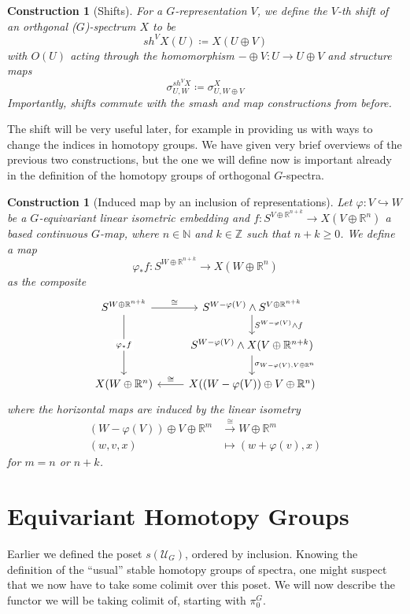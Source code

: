 \documentclass{scrartcl}
\newcommand{\bN}{\mathbb{N}}
\newcommand{\bZ}{\mathbb{Z}}
\newcommand{\bR}{\mathbb{R}}
\newtheorem{cons}[subsection]{Construction}
\begin{document}
\begin{cons}[Shifts]
    For a $G$-representation $V$, we define the \textit{$V$-th shift} of an orthgonal ($G$)-spectrum $X$ to be $$sh^VX(U)\coloneqq X(U\oplus V)$$ with $O(U)$ acting through the homomorphism $-\oplus V:U\to U\oplus V$ and structure maps $$\sigma^{sh^VX}_{U,W}\coloneqq \sigma^X_{U, W\oplus V}$$
    Importantly, shifts commute with the smash and map constructions from before.
\end{cons}

The shift will be very useful later, for example in providing us with ways to change the indices in homotopy groups. We have given very brief overviews of the previous two constructions, but the one we will define now is important already in the definition of the homotopy groups of orthogonal $G$-spectra.

\begin{cons}[Induced map by an inclusion of representations]
    Let $\varphi:V\hookrightarrow W$ be a $G$-equivariant linear isometric embedding and $f:S^{V\oplus\bR^{n+k}}\to X(V\oplus\bR^n)$ a based continuous $G$-map, where $n\in\bN$ and $k\in\bZ$ such that $n+k\geq 0$. We define a map $$\varphi_*f:S^{W\oplus\bR^{n+k}}\to X(W\oplus\bR^n)$$ as the composite
    \[\begin{tikzcd}
        S^{W\oplus\bR^{n+k}} \arrow[r, "\cong"] \arrow[dd, "\varphi_*f"{description}] & S^{W-\varphi(V)}\wedge S^{V\oplus \bR^{n+k}} \arrow[d, "S^{W-\varphi(V)}\wedge f"] \\
        & S^{W-\varphi(V)}\wedge X(V\oplus \bR^{n+k}) \arrow[d, "\sigma_{W-\varphi(V), V\oplus \bR^n}"] \\
        X(W\oplus\bR^n) &  X((W-\varphi(V))\oplus V\oplus \bR^n) \arrow[l, "\cong"']
    \end{tikzcd}\] 
    where the horizontal maps are induced by the linear isometry 
    \begin{align*}
        (W-\varphi(V))\oplus V\oplus \bR^m &\xrightarrow{\cong} W\oplus \bR^m \\
        (w,v,x)&\mapsto (w+\varphi(v),x)
    \end{align*}
    for $m=n$ or $n+k$.
\end{cons}

\section{Equivariant Homotopy Groups}

Earlier we defined the poset $s(\mathcal{U}_G)$, ordered by inclusion. Knowing the definition of the ``usual'' stable homotopy groups of spectra, one might suspect that we now have to take some colimit over this poset. We will now describe the functor we will be taking colimit of, starting with $\pi^G_0$.
\end{document}
